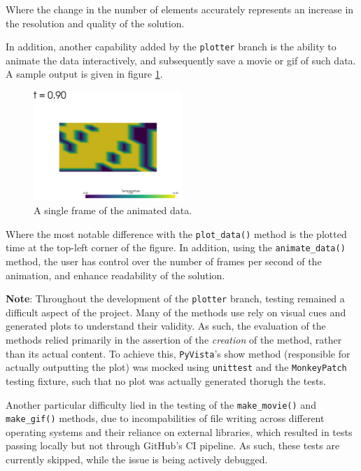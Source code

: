 \documentclass[headings=standardclasses, abstract=true]{scrartcl}
\begin{document}
Where the change in the number of elements accurately represents an increase in the resolution and quality of the solution.

In addition, another capability added by the \texttt{plotter} branch is the ability to animate the data interactively, and subsequently save a movie or gif of such data. A sample output is given in figure \ref{fig:PyVistaAnimated}.

\begin{figure}[H]
    \centering
    \includegraphics[width=0.5\textwidth]{figures/PyVista_Animated.png}
    \caption{A single frame of the animated data.}
    \label{fig:PyVistaAnimated}
\end{figure}

Where the most notable difference with the \texttt{plot\_data()} method is the plotted time at the top-left corner of the figure. In addition, using the \texttt{animate\_data()} method, the user has control over the number of frames per second of the animation, and enhance readability of the solution.

\textbf{Note}: Throughout the development of the \texttt{plotter} branch, testing remained a difficult aspect of the project. Many of the methods use rely on visual cues and generated plots to understand their validity. As such, the evaluation of the methods relied primarily in the assertion of the \textit{creation} of the method, rather than its actual content. To achieve this, \texttt{PyVista}'s show method (responsible for actually outputting the plot) was mocked using \texttt{unittest} and the \texttt{MonkeyPatch} testing fixture, such that no plot was actually generated thorugh the tests.

Another particular difficulty lied in the testing of the \texttt{make\_movie()} and \texttt{make\_gif()} methods, due to incompabilities of file writing across different operating systems and their reliance on external libraries, which resulted in tests passing locally but not through GitHub's CI pipeline. As such, these tests are currently skipped, while the issue is being actively debugged.
\end{document}
